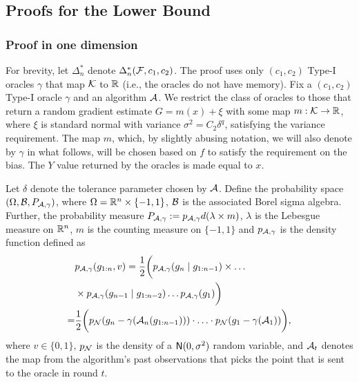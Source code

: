 \subsection{Proofs for the Lower Bound}
\label{sec:lb-proof}
\subsubsection{Proof in one dimension}
For brevity, let $\Delta_n^*$ denote $\Delta_n^*(\mathcal{F}, c_1,c_2)$.
The proof uses only $(c_1,c_2)$ Type-I oracles $\gamma$ that map $\mathcal{K}$ to $\mathbb{R}$ (i.e., the oracles do not have memory).
Fix a  $(c_1,c_2)$ Type-I oracle $\gamma$ and an algorithm $\mathcal{A}$.
We restrict the class of oracles to those that return a random gradient estimate $G = m(x) + \xi$ with some map $m: \mathcal{K} \to \mathbb{R}$,
where $\xi$ is standard normal with variance $\sigma^2 = C_2 \delta^q$, satisfying the variance requirement. 
The map $m$, which, by slightly abusing notation, we will also denote by $\gamma$ in what follows, will be chosen based on $f$ to satisfy the requirement on the bias. The $Y$ value returned by the oracles is made equal to $x$.

Let $\delta$ denote the tolerance parameter chosen by $\mathcal{A}$.
Define the probability space $(\Omega, \mathcal{B}, P_{\mathcal{A},\gamma})$, 
where $\Omega = \mathbb{R}^n\times \{-1,1\}$, $\mathcal{B}$ is the associated Borel sigma algebra. 
Further, the probability measure $P_{\mathcal{A},\gamma} := p_{\mathcal{A},\gamma} d(\lambda \times m)$, 
	$\lambda$ is the Lebesgue measure on $\mathbb{R}^n$, 
	$m$ is the counting measure on $\{-1,1\}$ and 
	$p_{\mathcal{A},\gamma}$ is the density function defined as
\begin{align*}
&p_{\mathcal{A},\gamma}(g_{1:n}, v) = \dfrac{1}{2} \bigg(p_{\mathcal{A},\gamma}(g_n \mid g_{1:n-1})\times \dots \\
&\times p_{\mathcal{A},\gamma }(g_{n-1} \mid g_{1:n-2}) \ldots p_{\mathcal{A},\gamma}(g_1)\bigg)\\
 = & \dfrac{1}{2} \bigg( p_{\mathcal{N}}(g_n - \gamma(\mathcal{A}_n(g_{1:n-1}))) \cdot
 \ldots \cdot  p_{\mathcal{N}}(g_1 - \gamma(\mathcal{A}_1))\bigg),
\end{align*}
where $v\in\{0,1\}$, $p_{\mathcal{N}}$ is the density of a $\mathsf{N}(0,\sigma^2)$ random variable,
and $\mathcal{A}_t$ denotes the map from the algorithm's past observations
that picks the point that is sent to the oracle in round $t$.

